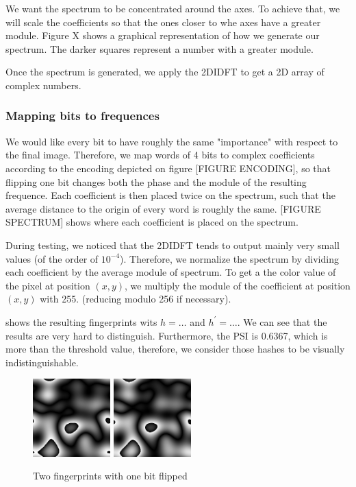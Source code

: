 \documentclass{article}
\begin{document}
We want the spectrum to be concentrated around the axes. To achieve that, we will scale the coefficients so that the ones closer to whe axes have a greater module. Figure X shows a graphical representation of how we generate our spectrum. The darker squares represent a number with a greater module.

Once the spectrum is generated, we apply the 2DIDFT to get a 2D array of complex numbers. 

\subsubsection{Mapping bits to frequences}
We would like every bit to have roughly the same "importance" with respect to the final image. Therefore, we map words of 4 bits to complex coefficients according to the encoding depicted on figure [FIGURE ENCODING], so that flipping one bit changes both the phase and the module of the resulting frequence. Each coefficient is then placed twice on the spectrum, such that the average distance to the origin of every word is roughly the same. [FIGURE SPECTRUM] shows where each coefficient is placed on the spectrum.

During testing, we noticed that the 2DIDFT tends to output mainly very small values (of the order of $10^{-4}$). Therefore, we normalize the spectrum by dividing each coefficient by the average module of spectrum. To get a the color value of the pixel at position $(x,y)$, we multiply the module of the coefficient at position $(x,y)$ with 255. (reducing modulo 256 if necessary).

 shows the resulting fingerprints wits $h = \dots$ and $h^\prime = \dots$. We can see that the results are very hard to distinguish. Furthermore, the PSI is 0.6367, which is more than the threshold value, therefore, we consider those hashes to be visually indistinguishable.

\begin{center}
\begin{figure}
    \centering
    \includegraphics[width=3cm]{figures/Nothing.png}
    \hspace{4pt}
    \includegraphics[width=3cm]{figures/NothingP67Psi0664}
    \caption{Two fingerprints with one bit flipped}
    \label{fig:nothing}
\end{figure}
\end{center}
\end{document}
